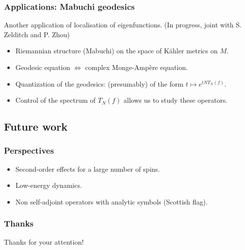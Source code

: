 \documentclass[mathserif]{beamer}
\begin{document}
\begin{frame}
  \frametitle{Applications: Mabuchi geodesics}
  Another application of localisation of eigenfunctions. (In progress,
  joint with S. Zelditch and P. Zhou)

  \vfill
  
  \begin{itemize}
  \item Riemannian structure (Mabuchi) on the space of Kähler metrics
  on $M$.
\item Geodesic equation $\Leftrightarrow$ complex Monge-Ampère
  equation.
\item<2-> {\color{myorange} Quantization} of the geodesics:
  (presumably) of the form $t\mapsto e^{tNT_N(f)}$.
\item<2-> Control of the spectrum of $T_N(f)$ allows us to study these operators.
  \end{itemize}
\end{frame}

\subsection{Future work}
\begin{frame}
  \frametitle{Perspectives}
    \begin{itemize}
    \item Second-order effects for a large number of spins.
    \item Low-energy dynamics.
    \item Non self-adjoint operators with analytic symbols (Scottish flag).
    \end{itemize}
  \end{frame}

  \begin{frame}
    \frametitle{Thanks}
    \centering 
    {\Large Thanks for your attention!}
  \end{frame}
  
\end{document}
